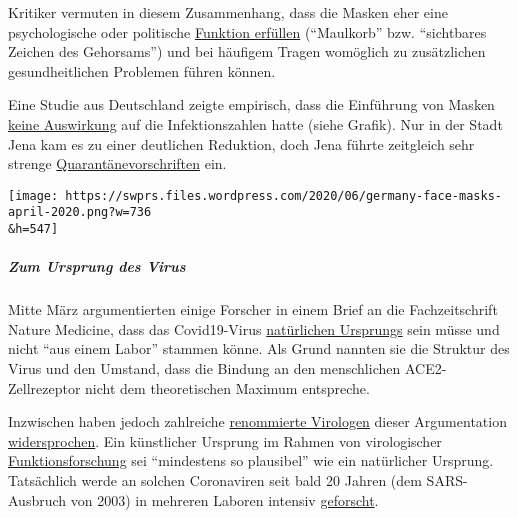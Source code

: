 Kritiker vermuten in diesem Zusammenhang, dass die Masken eher eine
psychologische oder politische
\href{https://multipolar-magazin.de/artikel/maskenpflicht-gesellschaftliches-klima}{Funktion
erfüllen} (``Maulkorb'' bzw. ``sichtbares Zeichen des Gehorsams'') und
bei häufigem Tragen womöglich zu zusätzlichen gesundheitlichen Problemen
führen können.

Eine Studie aus Deutschland zeigte empirisch, dass die Einführung von
Masken \href{http://ftp.iza.org/dp13319.pdf\#page=28}{keine Auswirkung}
auf die Infektionszahlen hatte (siehe Grafik). Nur in der Stadt Jena kam
es zu einer deutlichen Reduktion, doch Jena führte zeitgleich sehr
strenge
\href{https://www.mdr.de/thueringen/ost-thueringen/jena/corona-jena-seit-einer-woche-keine-neuinfektion-100.html}{Quarantänevorschriften}
ein.

\texttt{[image: https://swprs.files.wordpress.com/2020/06/germany-face-masks-april-2020.png?w=736\\\&h=547]}

\hypertarget{zum-ursprung-des-virus}{%
\subparagraph{\texorpdfstring{\textbf{Zum Ursprung des
Virus}}{Zum Ursprung des Virus}}\label{zum-ursprung-des-virus}}

Mitte März argumentierten einige Forscher in einem Brief an die
Fachzeitschrift Nature Medicine, dass das Covid19-Virus
\href{https://www.nature.com/articles/s41591-020-0820-9}{natürlichen
Ursprungs} sein müsse und nicht ``aus einem Labor'' stammen könne. Als
Grund nannten sie die Struktur des Virus und den Umstand, dass die
Bindung an den menschlichen ACE2-Zellrezeptor nicht dem theoretischen
Maximum entspreche.

Inzwischen haben jedoch zahlreiche
\href{https://www.independentsciencenews.org/health/the-case-is-building-that-covid-19-had-a-lab-origin/}{renommierte
Virologen} dieser Argumentation
\href{https://gmwatch.org/en/news/latest-news/19412-lab-escape-theory-of-sars-cov-2-origin-gaining-scientific-support}{widersprochen}.
Ein künstlicher Ursprung im Rahmen von virologischer
\href{https://medium.com/@yurideigin/lab-made-cov2-genealogy-through-the-lens-of-gain-of-function-research-f96dd7413748}{Funktionsforschung}
sei ``mindestens so plausibel'' wie ein natürlicher Ursprung.
Tatsächlich werde an solchen Coronaviren seit bald 20 Jahren (dem
SARS-Ausbruch von 2003) in mehreren Laboren intensiv
\href{https://gmwatch.org/en/news/latest-news/19410-chinese-and-us-scientists-genetically-engineered-bat-coronaviruses-in-dangerous-gain-of-function-research-stretching-back-years}{geforscht}.

